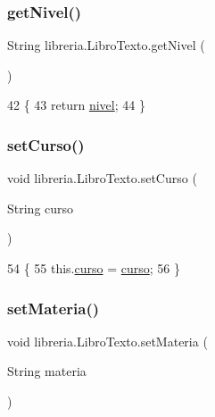 \subsubsection{\texorpdfstring{get\+Nivel()}{getNivel()}}
{\footnotesize\ttfamily String libreria.\+Libro\+Texto.\+get\+Nivel (\begin{DoxyParamCaption}{ }\end{DoxyParamCaption})\hspace{0.3cm}{\ttfamily [inline]}}


\begin{DoxyCode}
42                              \{
43         \textcolor{keywordflow}{return} \mbox{\hyperlink{classlibreria_1_1_libro_texto_a176cfd7d4cd77048392188fa39a444b9}{nivel}};
44     \}
\end{DoxyCode}
\mbox{\label{classlibreria_1_1_libro_texto_a03e1839a9708046f946ab314295f8aa0}} 
\subsubsection{\texorpdfstring{set\+Curso()}{setCurso()}}
{\footnotesize\ttfamily void libreria.\+Libro\+Texto.\+set\+Curso (\begin{DoxyParamCaption}\item[{String}]{curso }\end{DoxyParamCaption})\hspace{0.3cm}{\ttfamily [inline]}}


\begin{DoxyCode}
54                                        \{
55         this.\mbox{\hyperlink{classlibreria_1_1_libro_texto_a8ca1aa8329b1cc51b986d7826c25ee10}{curso}} = \mbox{\hyperlink{classlibreria_1_1_libro_texto_a8ca1aa8329b1cc51b986d7826c25ee10}{curso}};
56     \}
\end{DoxyCode}
\mbox{\label{classlibreria_1_1_libro_texto_a81c8634a47792e91d59ff9633c538565}} 
\subsubsection{\texorpdfstring{set\+Materia()}{setMateria()}}
{\footnotesize\ttfamily void libreria.\+Libro\+Texto.\+set\+Materia (\begin{DoxyParamCaption}\item[{String}]{materia }\end{DoxyParamCaption})\hspace{0.3cm}{\ttfamily [inline]}}


